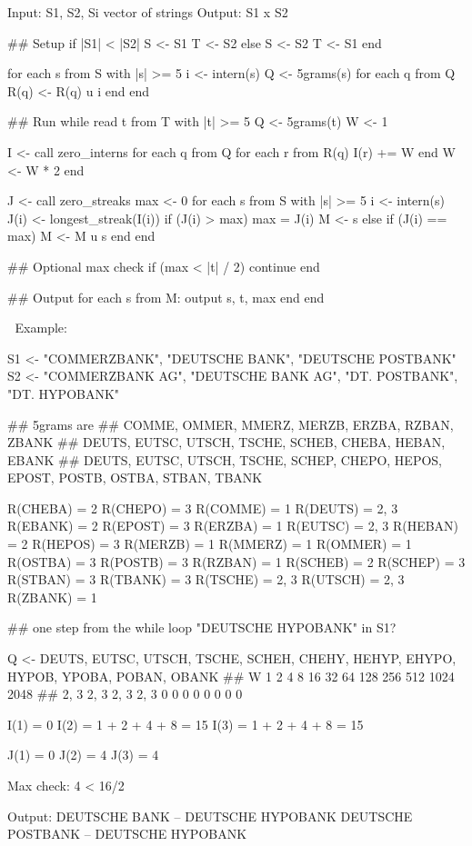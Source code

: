 Input: S1, S2,  Si vector of strings
Output: S1 x S2

## Setup
if |S1| < |S2|
	S <- S1
	T <- S2
else
	S <- S2
	T <- S1
end

for each s from S with |s| >= 5
	i <- intern(s)
	Q <- 5grams(s)
	for each q from Q
		R(q) <- R(q) u i
	end
end

## Run
while read t from T with |t| >= 5
	Q <- 5grams(t)
	W <- 1

	I <- call zero_interns
	for each q from Q
		for each r from R(q)
			I(r) += W
		end
		W <- W * 2
	end

	J <- call zero_streaks
	max <- 0
	for each s from S with |s| >= 5
		i <- intern(s)
		J(i) <- longest_streak(I(i))
		if (J(i) > max)
			max = J(i)
			M <- {s}
		else if (J(i) == max)
			M <- M u s
		end
	end

	## Optional max check
	if (max < |t| / 2)
		continue
	end

	## Output
	for each s from M:
		output s, t, max
	end
end




Example:

S1 <- "COMMERZBANK", "DEUTSCHE BANK", "DEUTSCHE POSTBANK"
S2 <- "COMMERZBANK AG", "DEUTSCHE BANK AG", "DT. POSTBANK", "DT. HYPOBANK"

## 5grams are
## COMME, OMMER, MMERZ, MERZB, ERZBA, RZBAN, ZBANK
## DEUTS, EUTSC, UTSCH, TSCHE, SCHEB, CHEBA, HEBAN, EBANK
## DEUTS, EUTSC, UTSCH, TSCHE, SCHEP, CHEPO, HEPOS, EPOST, POSTB, OSTBA, STBAN, TBANK

R(CHEBA) = 2
R(CHEPO) = 3
R(COMME) = 1
R(DEUTS) = 2, 3
R(EBANK) = 2
R(EPOST) = 3
R(ERZBA) = 1
R(EUTSC) = 2, 3
R(HEBAN) = 2
R(HEPOS) = 3
R(MERZB) = 1
R(MMERZ) = 1
R(OMMER) = 1
R(OSTBA) = 3
R(POSTB) = 3
R(RZBAN) = 1
R(SCHEB) = 2
R(SCHEP) = 3
R(STBAN) = 3
R(TBANK) = 3
R(TSCHE) = 2, 3
R(UTSCH) = 2, 3
R(ZBANK) = 1

## one step from the while loop
"DEUTSCHE HYPOBANK" in S1?

Q <- DEUTS, EUTSC, UTSCH, TSCHE, SCHEH, CHEHY, HEHYP, EHYPO, HYPOB, YPOBA, POBAN, OBANK
## W 1      2      4      8      16     32     64     128    256    512    1024   2048
##   2, 3   2, 3   2, 3   2, 3   0      0      0      0      0      0      0      0

I(1) = 0
I(2) = 1 + 2 + 4 + 8 = 15
I(3) = 1 + 2 + 4 + 8 = 15

J(1) = 0
J(2) = 4
J(3) = 4

Max check:
4 < 16/2

Output:
DEUTSCHE BANK -- DEUTSCHE HYPOBANK
DEUTSCHE POSTBANK -- DEUTSCHE HYPOBANK
